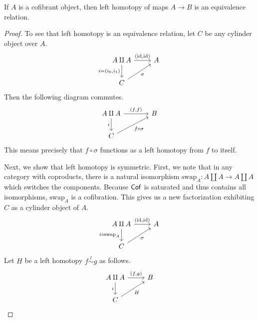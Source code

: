 \documentclass[main.tex]{subfiles}
\begin{document}
\begin{proposition}
  \label{prop:left_homotopy_is_equivalence_relation}
  If $A$ is a cofibrant object, then left homotopy of maps $A \to B$ is an equivalence relation.
\end{proposition}
\begin{proof}
  To see that left homotopy is an equivalence relation, let $C$ be any cylinder object over $A$.
  \begin{equation*}
    \begin{tikzcd}
      A \amalg A
      \arrow[r, "{(\id, \id)}"]
      \arrow[d, swap, "{i = (i_{0}, i_{1})}"]
      & A
      \\
      C
      \arrow[ur, swap, "\sigma"]
    \end{tikzcd}
  \end{equation*}
  Then the following diagram commutes.
  \begin{equation*}
    \begin{tikzcd}[column sep=large]
      A \amalg A
      \arrow[r, "{(f, f)}"]
      \arrow[d, swap, "i"]
      & B
      \\
      C
      \arrow[ur, swap, "f \circ \sigma"]
    \end{tikzcd}
  \end{equation*}
  This means precisely that $f \circ \sigma$ functions as a left homotopy from $f$ to itself.

  Next, we show that left homotopy is symmetric. First, we note that in any category with coproducts, there is a natural isomorphism $\mathrm{swap}_{A}\colon A \amalg A \to A \amalg A$ which switches the components. Because $\mathsf{Cof}$ is saturated and thus contains all isomorphisms, $\mathrm{swap}_{A}$ is a cofibration. This gives us a new factorization exhibiting $C$ as a cylinder object of $A$.
  \begin{equation*}
    \begin{tikzcd}
      A \amalg A
      \arrow[r, "{(\id, \id)}"]
      \arrow[d, swap, "i \circ \mathrm{swap}_{A}"]
      & A
      \\
      C
      \arrow[ur, swap, "\sigma"]
    \end{tikzcd}
  \end{equation*}
  Let $H$ be a left homotopy $f \overset{l}{\sim} g$ as follows.
  \begin{equation*}
    \begin{tikzcd}
      A \amalg A
      \arrow[r, "{(f, g)}"]
      \arrow[d, swap, "i"]
      & B
      \\
      C
      \arrow[ur, swap, "H"]
    \end{tikzcd}
  \end{equation*}


\end{proof}
\end{document}
